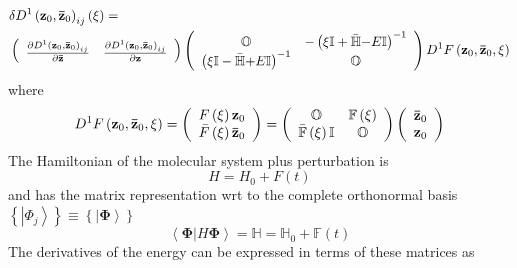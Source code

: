 \documentclass[aps,preprint]{revtex4}%
\begin{document}
\begin{align}
&  \delta D^{1}\left(  \mathbf{z}_{0},\mathbf{\bar{z}}_{0}\right)
_{ij}\left(  \xi\right)  =\\
&  \left(
\begin{array}
[c]{cc}%
\frac{\partial D^{1}\left(  \mathbf{z}_{0},\mathbf{\bar{z}}_{0}\right)  _{ij}%
}{\partial\mathbf{\bar{z}}} & \frac{\partial D^{1}\left(  \mathbf{z}%
_{0},\mathbf{\bar{z}}_{0}\right)  _{ij}}{\partial\mathbf{z}}%
\end{array}
\right)  \left(
\begin{array}
[c]{cc}%
\mathbb{O} & -\left(  \xi\mathbb{I+\bar{H}}\mathbf{-}E\mathbb{I}\right)
^{-1}\\
\left(  \xi\mathbb{I-\bar{H}}\mathbf{+}E\mathbb{I}\right)  ^{-1} & \mathbb{O}%
\end{array}
\right)  D^{1}F\left(  \mathbf{z}_{0},\mathbf{\bar{z}}_{0},\xi\right)
\end{align}
where
\begin{equation}
D^{1}F\left(  \mathbf{z}_{0},\mathbf{\bar{z}}_{0},\xi\right)  =\left(
\begin{array}
[c]{c}%
F\left(  \xi\right)  \mathbf{z}_{0}\\
\bar{F}\left(  \xi\right)  \mathbf{\bar{z}}_{0}%
\end{array}
\right)  =\left(
\begin{array}
[c]{cc}%
\mathbb{O} & \mathbb{F}\left(  \xi\right) \\
\mathbb{\bar{F}}\left(  \xi\right)  \mathbb{I} & \mathbb{O}%
\end{array}
\right)  \left(
\begin{array}
[c]{c}%
\mathbf{\bar{z}}_{0}\\
\mathbf{z}_{0}%
\end{array}
\right)
\end{equation}
The Hamiltonian of the molecular system plus perturbation is
\begin{equation}
H=H_{0}+F\left(  t\right)
\end{equation}
and has the matrix representation wrt to the complete orthonormal basis
$\left\{  \left\vert {\Phi}_{j}\right\rangle \right\}  \equiv\left\{
\left\vert \mathbf{\Phi}\right\rangle \right\}  $%
\begin{equation}
\left\langle \left.  \mathbf{\Phi}\right\vert H\mathbf{\Phi}\right\rangle
=\mathbb{H}=\mathbb{H}_{0}+\mathbb{F}\left(  t\right)
\end{equation}
The derivatives of the energy can be expressed in terms of these matrices as
\end{document}
